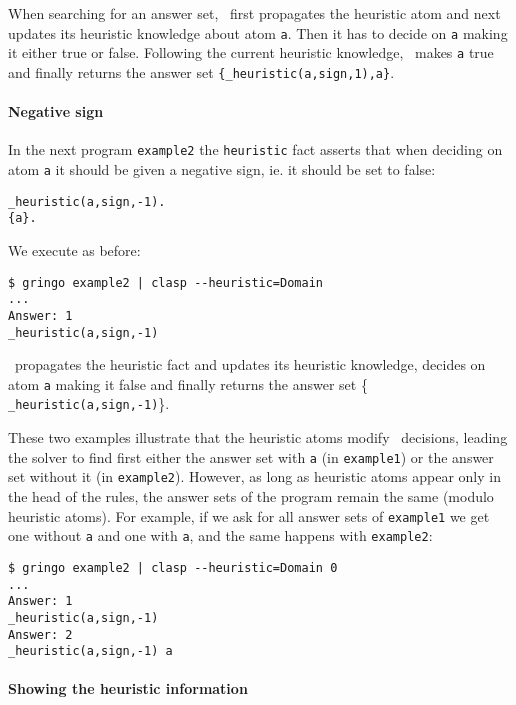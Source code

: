 When searching for an answer set, \clasp\ first propagates the heuristic atom and next updates its heuristic knowledge about atom \texttt{a}.
Then it has to decide on \texttt{a} making it either true or false.
Following the current heuristic knowledge,  \clasp\ makes \texttt{a} true and finally returns the answer set \texttt{\{\_heuristic(a,sign,1),a\}}.

\paragraph{Negative sign}

In the next program \texttt{example2} the \texttt{heuristic} fact  asserts that when deciding on atom \texttt{a}
it should be given a negative sign, ie. it should be set to false:
\begin{lstlisting}[numbers=none]
_heuristic(a,sign,-1).
{a}.
\end{lstlisting}
We execute as before:
\begin{lstlisting}[numbers=none]
$ gringo example2 | clasp --heuristic=Domain
...
Answer: 1
_heuristic(a,sign,-1)
\end{lstlisting}
\clasp\ propagates the heuristic fact and updates its heuristic knowledge,
decides on atom \texttt{a} making it false and finally returns the answer set \{ \texttt{\_heuristic(a,sign,-1)}\}.

These two examples illustrate that the heuristic atoms modify \clasp\ decisions,
leading the solver to find first either the answer set with \texttt{a} (in \texttt{example1}) or the answer set without it (in \texttt{example2}).
However, as long as heuristic atoms appear only in the head of the rules,
the answer sets of the program remain the same (modulo heuristic atoms).
For example, if we ask for all answer sets of \texttt{example1}  we get one without \texttt{a} and one with \texttt{a},
and the same happens with \texttt{example2}:
\begin{lstlisting}[numbers=none]
$ gringo example2 | clasp --heuristic=Domain 0
...
Answer: 1
_heuristic(a,sign,-1)
Answer: 2
_heuristic(a,sign,-1) a
\end{lstlisting}

\paragraph{Showing the heuristic information}


